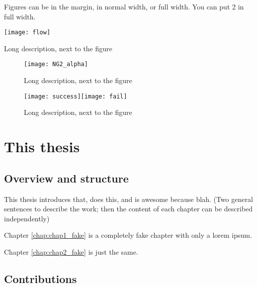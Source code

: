 Figures can be in the margin, in normal width, or full width. You can put 2 in full width.

\lipsum[1-3]


\begin{marginfigure}
\texttt{[image: flow]}
\label{fig:flow}
\caption[Short description found in the fig. table]{Long description, next to the figure}
\end{marginfigure}



\lipsum[1-3]

\begin{figure}[h!]
\begin{center}
\texttt{[image: NG2\_alpha]}
\end{center}
\caption[Short description found in the fig. table]{Long description, next to the figure}
\label{fig:NG_overview}
\end{figure}

\begin{figure*}[h!]
\begin{center}
\texttt{[image: success]}\texttt{[image: fail]}
\end{center}
\caption[Short description found in the fig. table]{Long description, next to the figure}
\label{fig:vocupdate}
\end{figure*}


\section{This thesis}

\subsection{Overview and structure}

This thesis introduces that, does this, and is awesome because blah. (Two general sentences to describe the work; then the content of each chapter can be described independently)

Chapter \ref{chap:chap1_fake} is a completely fake chapter with only a lorem ipsum.

Chapter \ref{chap:chap2_fake} is just the same.

\subsection{Contributions}

